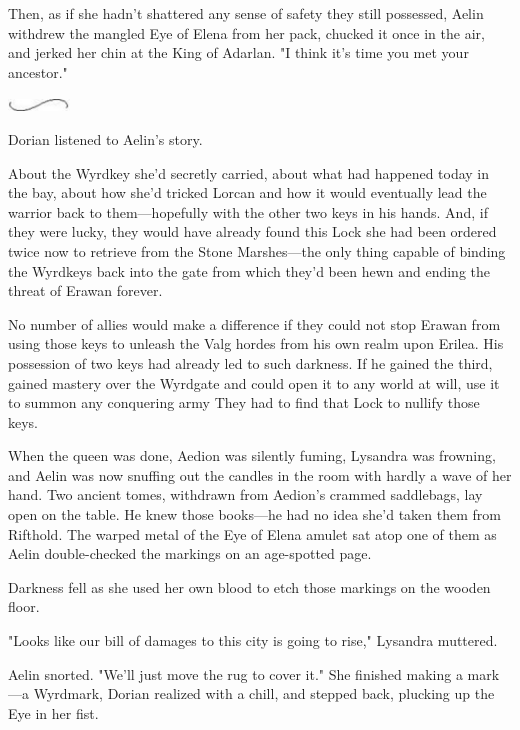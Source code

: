 Then, as if she hadn't shattered any sense of safety they still possessed, Aelin withdrew the mangled Eye of Elena from her pack, chucked it once in the air, and jerked her chin at the King of Adarlan.
"I think it's time you met your ancestor."

\begin{center}
	\includegraphics[width=0.65in,height=0.13in]{images/seperator}
\end{center}

Dorian listened to Aelin's story.

About the Wyrdkey she'd secretly carried, about what had happened today in the bay, about how she'd tricked Lorcan and how it would eventually lead the warrior back to them---hopefully with the other two keys in his hands.
And, if they were lucky, they would have already found this Lock she had been ordered twice now to retrieve from the Stone Marshes---the only thing capable of binding the Wyrdkeys back into the gate from which they'd been hewn and ending the threat of Erawan forever.

No number of allies would make a difference if they could not stop Erawan from using those keys to unleash the Valg hordes from his own realm upon Erilea.
His possession of two keys had already led to such darkness.
If he gained the third, gained mastery over the Wyrdgate and could open it to any world at will, use it to summon any conquering army  They had to find that Lock to nullify those keys.

When the queen was done, Aedion was silently fuming, Lysandra was frowning, and Aelin was now snuffing out the candles in the room with hardly a wave of her hand.
Two ancient tomes, withdrawn from Aedion's crammed saddlebags, lay open on the table.
He knew those books---he had no idea she'd taken them from Rifthold.
The warped metal of the Eye of Elena amulet sat atop one of them as Aelin double-checked the markings on an age-spotted page.

Darkness fell as she used her own blood to etch those markings on the wooden floor.

"Looks like our bill of damages to this city is going to rise," Lysandra muttered.

Aelin snorted.
"We'll just move the rug to cover it."
She finished making a mark---a Wyrdmark, Dorian realized with a chill, and stepped back, plucking up the Eye in her fist.

